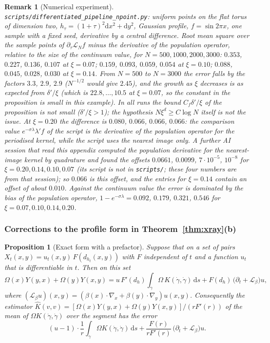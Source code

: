 \documentclass[11pt,a4paper]{article}
\theoremstyle{stmt}
\newtheorem{proposition}[theorem]{Proposition}
\theoremstyle{defn}
\theoremstyle{rmk}
\newtheorem{remark}[theorem]{Remark}
\numberwithin{equation}{section}
\newcommand{\Lie}{\mathcal{L}}
\newcommand{\Lc}{\mathcal{L}}
\newcommand{\dd}{\mathrm{d}}
\begin{document}
{\begin{remark}[Numerical experiment]
\texttt{scripts/differentiated\_pipeline\_npoint.py}: uniform points on the flat torus of dimension two, $h_\tau=(1+\tau)^2\dd x^2+\dd y^2$, Gaussian profile, $f=\sin2\pi x$, one sample with a fixed seed, derivative by a central difference. Root mean square over the sample points of $\partial_\tau\Lc_Nf$ minus the derivative of the population operator, relative to the size of the continuum value, for $N=500,1000,2000,3000$: $0.353$, $0.227$, $0.136$, $0.107$ at $\xi=0.07$; $0.159$, $0.093$, $0.059$, $0.054$ at $\xi=0.10$; $0.088$, $0.045$, $0.028$, $0.030$ at $\xi=0.14$. From $N=500$ to $N=3000$ the error falls by the factors $3.3$, $2.9$, $2.9$ ($N^{-1/2}$ would give $2.45$), and the growth as $\xi$ decreases is as expected from $\delta'/\xi$ (which is $22.8,\dots,10.5$ at $\xi=0.07$, so the constant in the proposition is small in this example). In all runs the bound $C_f\delta'/\xi$ of the proposition is not small ($\delta'/\xi>1$); the hypothesis $N\xi^d\ge C\log N$ itself is not the issue. At $\xi=0.20$ the difference is $0.080$, $0.066$, $0.066$, $0.066$: the comparison value $e^{-\sigma\lambda}\lambda'f$ of the script is the derivative of the population operator for the periodised kernel, while the script uses the nearest image only. A further AI session that read this appendix computed the population derivative for the nearest-image kernel by quadrature and found the offsets $0.0661$, $0.0099$, $7\cdot10^{-5}$, $10^{-8}$ for $\xi=0.20,0.14,0.10,0.07$ (its script is not in \texttt{scripts/}; these four numbers are from that session); so $0.066$ is this offset, and the entries for $\xi=0.14$ contain an offset of about $0.010$. Against the continuum value the error is dominated by the bias of the population operator, $1-e^{-\sigma\lambda}=0.092$, $0.179$, $0.321$, $0.546$ for $\xi=0.07,0.10,0.14,0.20$.
\end{remark}

\subsubsection{Corrections to the profile form in Theorem~\ref{thm:xray}(b)}

\begin{proposition}[Exact form with a prefactor]\label{prop:prefactor}
Suppose that on a set of pairs $X_t(x,y)=u_t(x,y)\,F(d_{h_t}(x,y))$ with $F$ independent of $t$ and a function $u_t$ that is differentiable in $t$. Then on this set
\[
\Omega(x)Y(y,x)+\Omega(y)Y(x,y)=u\,F'(d_h)\int_\gamma\Omega\,K(\dot\gamma,\dot\gamma)\,\dd s+F(d_h)\,\big(\partial_t+\Lie_\beta\big)u ,
\]
where $(\Lie_\beta u)(x,y)=(\beta(x)\cdot\nabla_x+\beta(y)\cdot\nabla_y)u(x,y)$. Consequently the estimator $\hat K(v,v)=[\Omega(x)Y(y,x)+\Omega(y)Y(x,y)]/(rF'(r))$ of the mean of $\Omega K(\dot\gamma,\dot\gamma)$ over the segment has the error
\[
(u-1)\cdot\frac1r\int_\gamma\Omega K(\dot\gamma,\dot\gamma)\,\dd s+\frac{F(r)}{rF'(r)}\,\big(\partial_t+\Lie_\beta\big)u .
\]
\end{proposition}

}
\end{document}
